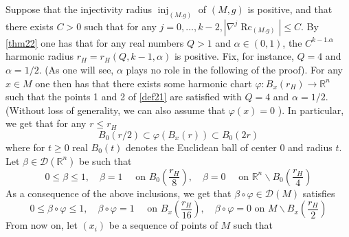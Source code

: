 \documentclass[12pt,hyperref,a4paper,UTF8]{ctexart}
\begin{document}
\begin{Proof}
Suppose that the injectivity radius $\operatorname{inj}_{(M . g)}$ of $(M, g)$ is positive, and that there exists $C>0$ such that for any $j=0, \ldots, k-2,\left|\nabla^j \operatorname{Rc}_{(M . g)}\right| \leq C$. By \autoref{thm22} one has that for any real numbers $Q>1$ and $\alpha \in(0,1)$, the $C^{k-1 . \alpha}$ harmonic radius $r_H=r_H(Q, k-1, \alpha)$ is positive. Fix, for instance, $Q=4$ and $\alpha=1 / 2$. (As one will see, $\alpha$ plays no role in the following of the proof). For any $x \in M$ one then has that there exists some harmonic chart $\varphi: B_x\left(r_H\right) \rightarrow \mathbb{R}^n$ such that the points 1 and 2 of \autoref{def21} are satisfied with $Q=4$ and $\alpha=1 / 2$. (Without loss of generality, we can also assume that $\varphi(x)=0$ ). In particular, we get that for any $r \leq r_H$
$$
B_0(r / 2) \subset \varphi\left(B_x(r)\right) \subset B_0(2 r)
$$
where for $t \geq 0$ real $B_0(t)$ denotes the Euclidean ball of center 0 and radius $t$. Let $\beta \in \mathcal{D}\left(\mathbb{R}^n\right)$ be such that
$$
0 \leq \beta \leq 1, \quad \beta=1 \quad \text { on } B_0\left(\frac{r_H}{8}\right), \quad \beta=0 \quad \text { on } \mathbb{R}^n \backslash B_0\left(\frac{r_H}{4}\right)
$$
As a consequence of the above inclusions, we get that $\beta \circ \varphi \in \mathcal{D}(M)$ satisfies
$$
0 \leq \beta \circ \varphi \leq 1, \quad \beta \circ \varphi=1 \quad \text { on } B_x\left(\frac{r_H}{16}\right), 
\quad\beta \circ \varphi=0  \text { on } M \backslash B_x\left(\frac{r_H}{2}\right)
$$
From now on, let $\left(x_i\right)$ be a sequence of points of $M$ such that


\end{Proof}
\end{document}
